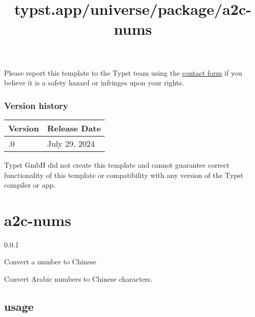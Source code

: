 Please report this template to the Typst team using the
\href{https://typst.app/contact}{contact form} if you believe it is a
safety hazard or infringes upon your rights.

\label{versions}
\subsubsection{Version history}\label{version-history}

\begin{longtable}[]{@{}ll@{}}
\toprule\noalign{}
Version & Release Date \\
\midrule\noalign{}
\endhead
\bottomrule\noalign{}
\endlastfoot
0.1.0 & July 29, 2024 \\
\end{longtable}

Typst GmbH did not create this template and cannot guarantee correct
functionality of this template or compatibility with any version of the
Typst compiler or app.


\title{typst.app/universe/package/a2c-nums}

\label{banner}
\section{a2c-nums}\label{a2c-nums}

{ 0.0.1 }

Convert a number to Chinese

\label{readme}
Convert Arabic numbers to Chinese characters.

\subsection{usage}\label{usage}

\begin{Shaded}
\begin{Highlighting}[]




\end{Highlighting}
\end{Shaded}

